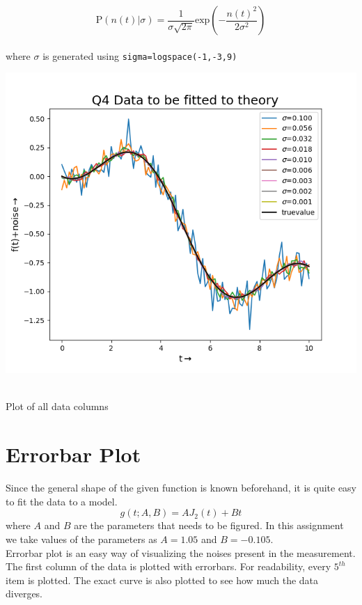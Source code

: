\documentclass[12pt, a4paper]{report}
\begin{document}
 \begin{equation*}
\mathrm{P}(n(t)|\sigma)=\frac{1}{\sigma\sqrt{2\pi}}\text{exp}\left(-\frac{n(t)^{2}}{2\sigma^{2}}\right)
\end{equation*}
\\
where $\sigma$ is generated using \texttt{sigma=logspace(-1,-3,9)} 
\begin{center}
	\includegraphics[scale=0.80]{Figure_0} 
	\caption{\\Plot of all data columns}
	\label{fig:rawdata}
\end{center}


\section*{Errorbar Plot}

Since the general shape of the given function is known beforehand, it is quite easy to fit the data to a model. 
\begin{equation*}
 g(t;A,B) = AJ_2(t) + Bt
\end{equation*}
where $A$ and $B$ are the parameters that needs to be figured. In this assignment we take values of the parameters as $A = 1.05$ and $B = -0.105$.
\\

Errorbar plot is an easy way of visualizing the noises present in the measurement. The first column of the data is plotted with errorbars. For readability, every $5^{th}$ item is plotted. The exact curve is also plotted to see how much the data diverges.
\end{document}
